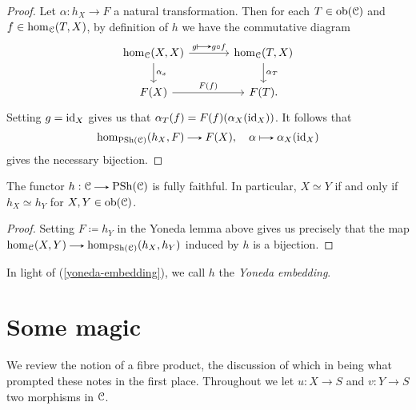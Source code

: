 \begin{proof}
  Let $\alpha : h_X \to F$ a natural transformation. Then for each $T
  \in \operatorname{ob}(\mathcal{C})$ and $f \in \operatorname{hom}_{\mathcal{C}}(T,X)$, by definition of $h$ we have
  the commutative diagram
  \[
  \begin{tikzcd}[column sep = large]
    \hom_\C(X,X) \rar{g \mapsto g \circ f} \dar{\alpha_x} &
    \hom_\C(T,X) \dar{\alpha_T} \\ F(X) \rar{F(f)} & F(T).
  \end{tikzcd}
  \]
  Setting $g = \mathrm{id}_X$ gives us that $\alpha_T(f) =
  F(f)(\alpha_X(\mathrm{id}_X))$. It follows that
  \[
  \hom_{\PSh(\C)}(h_X, F) \to F(X), \quad \alpha \mapsto
  \alpha_X(\id_X)
  \]
  gives the necessary bijection.
\end{proof}

\begin{corollary}
  \label{yoneda-embedding}
  The functor $h : \C \to \PSh(\C)$ is fully faithful. In particular, $X
  \simeq Y$ if and only if $h_X \simeq h_Y$ for $X,Y \in \operatorname{ob}(\mathcal{C})$.
\end{corollary}

\begin{proof}
  Setting $F \coloneqq h_Y$ in the Yoneda lemma above gives us
  precisely that the map $\hom_\C(X,Y) \to \hom_{\PSh(\C)}(h_X,h_Y)$
  induced by $h$ is a bijection.
\end{proof}

\begin{remark}
  In light of (\ref{yoneda-embedding}), we call $h$ the \textit{Yoneda
    embedding}.
\end{remark}


\section{Some magic}

We review the notion of a fibre product, the discussion of which in
\cite{gortzwedhorn} being what prompted these notes in the first
place. Throughout we let $u : X \to S$ and $v : Y \to S$ two morphisms
in $\mathcal{C}$.

